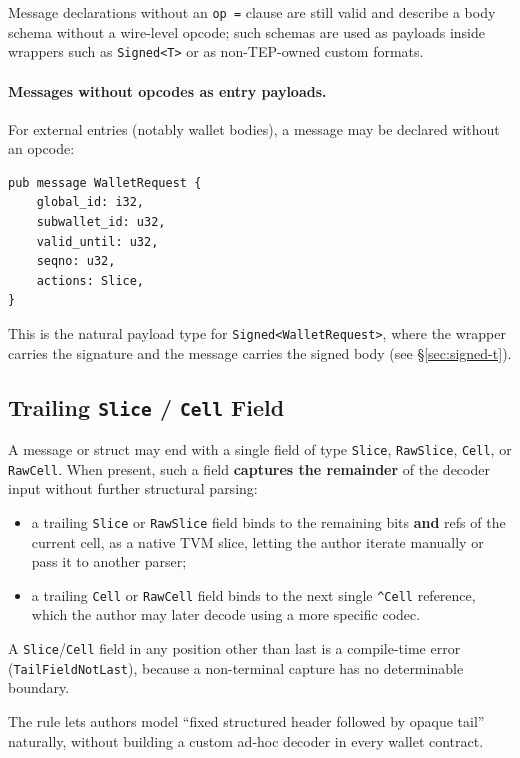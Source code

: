 \documentclass[12pt,oneside]{article}
\begin{document}
Message declarations without an \verb|op =| clause are still valid and
describe a body schema without a wire-level opcode; such schemas are
used as payloads inside wrappers such as \verb|Signed<T>| or as
non-TEP-owned custom formats.

\paragraph{Messages without opcodes as entry payloads.}
For external entries (notably wallet bodies), a message may be declared
without an opcode:

\begin{verbatim}
pub message WalletRequest {
    global_id: i32,
    subwallet_id: u32,
    valid_until: u32,
    seqno: u32,
    actions: Slice,
}
\end{verbatim}

This is the natural payload type for \verb|Signed<WalletRequest>|,
where the wrapper carries the signature and the message carries the
signed body (see \S\ref{sec:signed-t}).

\subsection{Trailing \texttt{Slice} / \texttt{Cell} Field}
\label{sec:trailing-slice}
A message or struct may end with a single field of type \verb|Slice|,
\verb|RawSlice|, \verb|Cell|, or \verb|RawCell|. When present, such a
field \textbf{captures the remainder} of the decoder input without
further structural parsing:

\begin{itemize}
\item a trailing \verb|Slice| or \verb|RawSlice| field binds to the
remaining bits \textbf{and} refs of the current cell, as a native TVM
slice, letting the author iterate manually or pass it to another
parser;
\item a trailing \verb|Cell| or \verb|RawCell| field binds to the next
single \verb|^Cell| reference, which the author may later decode
using a more specific codec.
\end{itemize}

A \verb|Slice|/\verb|Cell| field in any position other than last is a
compile-time error (\verb|TailFieldNotLast|), because a non-terminal
capture has no determinable boundary.

The rule lets authors model ``fixed structured header followed by
opaque tail'' naturally, without building a custom ad-hoc decoder in
every wallet contract.
\end{document}
